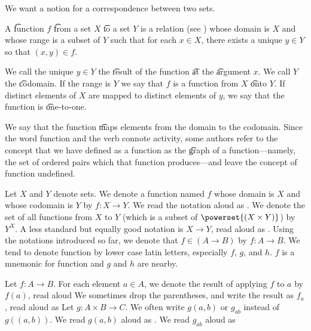 

We want a notion for a correspondence between two sets.


A \t{function} $f$ \t{from} a set $X$ \t{to} a set $Y$ is a relation (see ) whose domain is $X$ and whose range is a subset of $Y$ such that for each $x \in X$, there exists a unique $y \in Y$ so that $(x, y) \in f$.

We call the unique $y \in Y$ the \t{result} of the function \t{at} the \t{argument} $x$.
We call $Y$ the \t{codomain}.
If the range is $Y$ we say that $f$ is a function from $X$ \t{onto} $Y$.
If distinct elements of $X$ are mapped to distinct elements of $y$, we say that the function is \t{one-to-one}.

We say that the function \t{maps} elements from the domain to the codomain.
Since the word function and the verb  connote activity, some authors refer to the concept that we have defined as a function as the \t{graph} of a function---namely, the set of ordered pairs which that function produces---and leave the concept of function undefined.


Let $X$ and $Y$ denote sets.
We denote a function named $f$ whose domain is $X$ and whose codomain is $Y$ by $f: X \to Y$.
We read the notation aloud as .
We denote the set of all functions from $X$ to $Y$ (which is a subset of $\powerset{(X \times Y)}$) by $Y^{X}$.
A less standard but equally good notation is $X \to Y$, read aloud as .
Using the notations introduced so far, we denote that $f \in (A \to B)$ by $f: A \to B$.
We tend to denote function by lower case latin letters, especially $f$, $g$, and $h$.
$f$ is a mnemonic for function and $g$ and $h$ are nearby.

Let $f: A \to B$.
For each element $a \in A$, we denote the result of applying $f$ to $a$ by $f(a)$, read aloud 
We sometimes drop the parentheses, and write the result as $f_a$, read aloud as 
Let $g: A \times B \to C$.
We often write $g(a,b)$ or $g_{ab}$ instead of $g((a,b))$.
We read $g(a, b)$ aloud as .
We read $g_{ab}$ aloud as 

